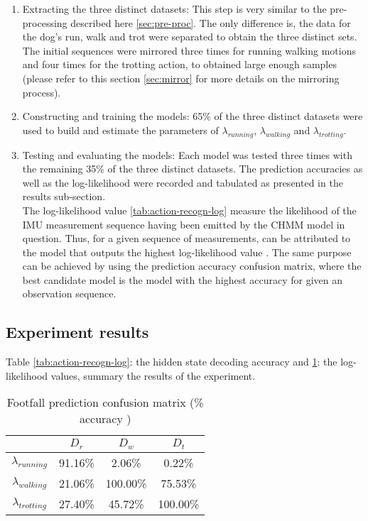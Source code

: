 \begin{enumerate}
	\item Extracting the three distinct datasets: This step is very similar to the pre-processing described here \ref{sec:pre-proc}. The only difference is, the data for the dog's run, walk and trot were separated to obtain the three distinct sets. The initial sequences were mirrored three times for running walking motions and four times for the trotting action, to obtained large enough samples (please refer to this section \ref{sec:mirror} for more details on the mirroring process).
	
	\item Constructing and training the models: 65\% of the three distinct datasets were used to build and estimate the parameters of \(\lambda_{running}\), \(\lambda_{walking}\) and \(\lambda_{trotting}\).
	
	\item Testing and evaluating the models: Each model was tested three times with the remaining 35\% of the three distinct datasets. The prediction accuracies as well as the log-likelihood were recorded and tabulated as presented in the results sub-section.\\
	The log-likelihood value \ref{tab:action-recogn-log} measure the likelihood of the IMU measurement sequence having been emitted by the CHMM model in question.
	Thus, for a given sequence of measurements, can be attributed to the model that outputs the highest log-likelihood value \cite{cont2013}.
	The same purpose can be achieved by using the prediction accuracy confusion matrix, where the best candidate model is the model  with the highest accuracy for given an observation sequence.
\end{enumerate} 

\subsection{Experiment results}

Table \ref{tab:action-recogn-log}: the hidden state decoding accuracy and \ref{tab:action-recogn-acc}: the log-likelihood values, summary the results of the experiment.\\

\begin{table}[h!] 
	\centering
	\begin{tabular}{ |c|c|c|c|} 	
		\hline	
		& \(D_r\) &  \(D_w\) & \(D_t\)\\ 
		\hline
		\(\lambda_{running}\) & 91.16\% & 2.06\% & 0.22\% \\ 
		\hline
		\(\lambda_{walking}\) & 21.06\% & 100.00\% & 75.53\% \\ 
		\hline
		\(\lambda_{trotting}\) & 27.40\% & 45.72\% & 100.00\%\\
		\hline	   	
	\end{tabular}
	\caption{Footfall prediction confusion matrix (\% accuracy )}
	\label{tab:action-recogn-acc}
\end{table}

